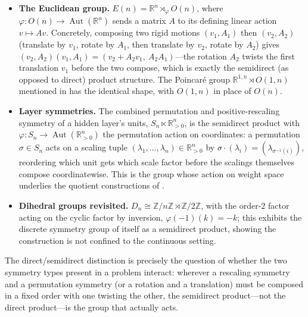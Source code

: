 \documentclass[mathematics,review,submit,moreauthors]{Definitions/mdpi}
\begin{document}
\begin{Example}\label{ex:semidirect-products}
\phantom{u}
\begin{itemize}
    \item \textbf{The Euclidean group.} $E(n) = \mathbb{R}^n \rtimes_\varphi
    O(n)$, where $\varphi : O(n) \to \operatorname{Aut}(\mathbb{R}^n)$ sends a
    matrix $A$ to its defining linear action $v \mapsto Av$. Concretely,
    composing two rigid motions $(v_1, A_1)$ then $(v_2,A_2)$ (translate by
    $v_1$, rotate by $A_1$, then translate by $v_2$, rotate by $A_2$) gives
    $(v_2, A_2)(v_1,A_1) = (v_2 + A_2 v_1,\ A_2 A_1)$---the rotation
    $A_2$ twists the first translation $v_1$ before the two compose, which
    is exactly the semidirect (as opposed to direct) product structure. The
    Poincar\'e group $\mathbb{R}^{1,n} \rtimes O(1,n)$ mentioned in
     has the identical shape, with $O(1,n)$ in
    place of $O(n)$.
    \item \textbf{Layer symmetries.} The combined permutation and
    positive-rescaling symmetry of a hidden layer's units,
    $S_n \ltimes \mathbb{R}_{>0}^n$, is the semidirect product with
    $\varphi : S_n \to \operatorname{Aut}(\mathbb{R}_{>0}^n)$ the permutation
    action on coordinates: a permutation $\sigma \in S_n$ acts on a scaling
    tuple $(\lambda_1,\dots,\lambda_n) \in \mathbb{R}_{>0}^n$ by
    $\sigma \cdot (\lambda_i) = (\lambda_{\sigma^{-1}(i)})$, reordering which
    unit gets which scale factor before the scalings themselves compose
    coordinatewise. This is the group whose action on weight space underlies
    the quotient constructions of
    .
    \item \textbf{Dihedral groups revisited.} $D_n \cong \mathbb{Z}/n\mathbb{Z}
    \rtimes \mathbb{Z}/2\mathbb{Z}$, with the order-$2$ factor acting on the
    cyclic factor by inversion, $\varphi(-1)(k) = -k$; this exhibits the
    discrete symmetry group of  itself as a
    semidirect product, showing the construction is not confined to the
    continuous setting.
\end{itemize}
\end{Example}

The direct/semidirect distinction is precisely the question of whether the
two symmetry types present in a problem interact: wherever a rescaling
symmetry and a permutation symmetry (or a rotation and a translation) must be
composed in a fixed order with one twisting the other, the semidirect
product---not the direct product---is the group that actually acts.
\end{document}
